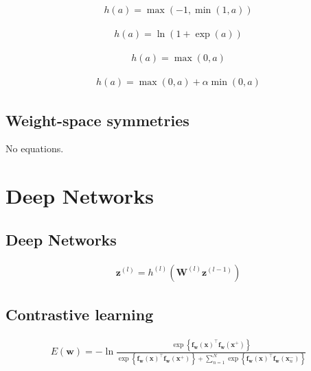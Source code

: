 \documentclass{article}
\begin{document}
\begin{align*}
h(a)=\max (-1, \min (1, a)) 
\tag{6.15}
\end{align*}

\begin{align*}
h(a)=\ln (1+\exp (a)) 
\tag{6.16}
\end{align*}

\begin{align*}
h(a)=\max (0, a) 
\tag{6.17}
\end{align*}

\begin{align*}
h(a)=\max (0, a)+\alpha \min (0, a) 
\tag{6.18}
\end{align*}

\subsection{Weight-space symmetries}

No equations.

\section{Deep Networks}

\subsection{Deep Networks}

\begin{align*}
\mathbf{z}^{(l)}=h^{(l)}\left(\mathbf{W}^{(l)} \mathbf{z}^{(l-1)}\right) 
\tag{6.19}
\end{align*}

\subsection{Contrastive learning}

\begin{align*}
E(\mathbf{w})=-\ln \frac{\exp \left\{\mathbf{f}_{\mathbf{w}}(\mathbf{x})^{\top} \mathbf{f}_{\mathbf{w}}\left(\mathbf{x}^{+}\right)\right\}}{\exp \left\{\mathbf{f}_{\mathbf{w}}(\mathbf{x})^{\top} \mathbf{f}_{\mathbf{w}}\left(\mathbf{x}^{+}\right)\right\}+\sum_{n=1}^{N} \exp \left\{\mathbf{f}_{\mathbf{w}}(\mathbf{x})^{\top} \mathbf{f}_{\mathbf{w}}\left(\mathbf{x}_{n}^{-}\right)\right\}} 
\tag{6.20}
\end{align*}
\end{document}
